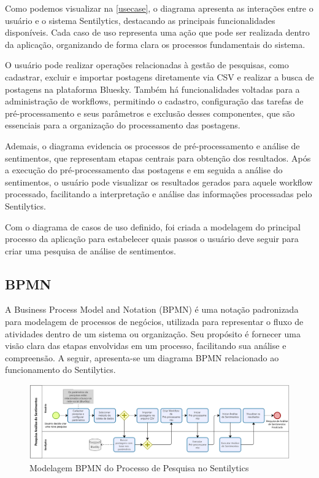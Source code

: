 \documentclass[
	12pt,				%
	oneside,			%
	a4paper,			%
	english,			%
	french,				%
	spanish,			%
	brazil				%
	]{abntex2}
\begin{document}
Como podemos visualizar na \autoref{usecase}, o diagrama apresenta as
interações entre o usuário e o sistema Sentilytics, destacando as
principais funcionalidades disponíveis. Cada caso de uso representa uma
ação que pode ser realizada dentro da aplicação, organizando de forma
clara os processos fundamentais do sistema.

O usuário pode realizar operações relacionadas à gestão de pesquisas,
como cadastrar, excluir e importar postagens diretamente via CSV e
realizar a busca de postagens na plataforma Bluesky. Também há
funcionalidades voltadas para a administração de workflows, permitindo o
cadastro, configuração das tarefas de pré-processamento e seus
parâmetros e exclusão desses componentes, que são essenciais para a
organização do processamento das postagens.

Ademais, o diagrama evidencia os processos de pré-processamento e
análise de sentimentos, que representam etapas centrais para obtenção
dos resultados. Após a execução do pré-processamento das postagens e em
seguida a análise do sentimentos, o usuário pode visualizar os
resultados gerados para aquele workflow processado, facilitando a
interpretação e análise das informações processadas pelo Sentilytics.

Com o diagrama de casos de uso definido, foi criada a modelagem do
principal processo da aplicação para estabelecer quais passos o usuário
deve seguir para criar uma pesquisa de análise de sentimentos.

\hypertarget{bpmn}{%
\subsection{BPMN}\label{bpmn}}

A Business Process Model and Notation (BPMN) é uma notação padronizada
para modelagem de processos de negócios, utilizada para representar o
fluxo de atividades dentro de um sistema ou organização. Seu propósito é
fornecer uma visão clara das etapas envolvidas em um processo,
facilitando sua análise e compreensão. A seguir, apresenta-se um
diagrama BPMN relacionado ao funcionamento do Sentilytics.

\begin{figure}[htbp]
\hypertarget{bpmn_pesquisa}{%
\caption{Modelagem BPMN do Processo de Pesquisa no Sentilytics}\label{bpmn_pesquisa}
\begin{center}
\includegraphics[scale=0.27]{imagens/sentilytics/pesquisa_sentimentos.png}
\end{center}
}
\end{figure}
\end{document}

